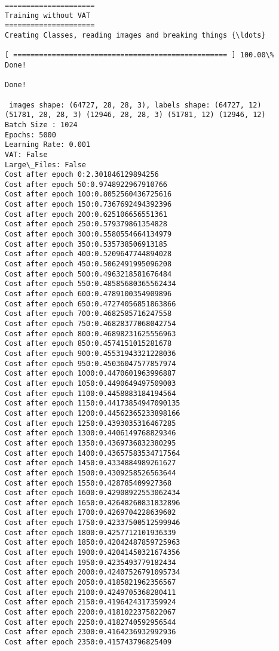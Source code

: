 \documentclass[11pt]{article}
\begin{document}
    \begin{Verbatim}[commandchars=\\\{\}]
=====================
Training without VAT
=====================
Creating Classes, reading images and breaking things {\ldots}

[ ================================================== ] 100.00\%
Done!

Done!

 images shape: (64727, 28, 28, 3), labels shape: (64727, 12)
(51781, 28, 28, 3) (12946, 28, 28, 3) (51781, 12) (12946, 12)
Batch Size : 1024
Epochs: 5000
Learning Rate: 0.001
VAT: False
Large\_Files: False 
Cost after epoch 0:2.301846129894256
Cost after epoch 50:0.9748922967910766
Cost after epoch 100:0.8052560436725616
Cost after epoch 150:0.7367692494392396
Cost after epoch 200:0.625106656551361
Cost after epoch 250:0.579379861354828
Cost after epoch 300:0.5580554664134979
Cost after epoch 350:0.535738506913185
Cost after epoch 400:0.5209647744894028
Cost after epoch 450:0.5062491995096208
Cost after epoch 500:0.4963218581676484
Cost after epoch 550:0.48585680365562434
Cost after epoch 600:0.4789100354909896
Cost after epoch 650:0.47274056851863866
Cost after epoch 700:0.4682585716247558
Cost after epoch 750:0.46828377068042754
Cost after epoch 800:0.46898231625556963
Cost after epoch 850:0.4574151015281678
Cost after epoch 900:0.45531943321228036
Cost after epoch 950:0.45036047577857974
Cost after epoch 1000:0.4470601963996887
Cost after epoch 1050:0.4490649497509003
Cost after epoch 1100:0.4458883184194564
Cost after epoch 1150:0.44173854947090135
Cost after epoch 1200:0.44562365233898166
Cost after epoch 1250:0.4393035316467285
Cost after epoch 1300:0.4406149768829346
Cost after epoch 1350:0.4369736832380295
Cost after epoch 1400:0.43657583534717564
Cost after epoch 1450:0.4334884989261627
Cost after epoch 1500:0.4309258526563644
Cost after epoch 1550:0.428785409927368
Cost after epoch 1600:0.42908922553062434
Cost after epoch 1650:0.42648260831832896
Cost after epoch 1700:0.4269704228639602
Cost after epoch 1750:0.42337500512599946
Cost after epoch 1800:0.4257712101936339
Cost after epoch 1850:0.42042487859725963
Cost after epoch 1900:0.42041450321674356
Cost after epoch 1950:0.4235493779182434
Cost after epoch 2000:0.42407526791095734
Cost after epoch 2050:0.4185821962356567
Cost after epoch 2100:0.4249705368280411
Cost after epoch 2150:0.4196424317359924
Cost after epoch 2200:0.4181022375822067
Cost after epoch 2250:0.4182740592956544
Cost after epoch 2300:0.4164236932992936
Cost after epoch 2350:0.415743796825409

\end{Verbatim}
\end{document}
